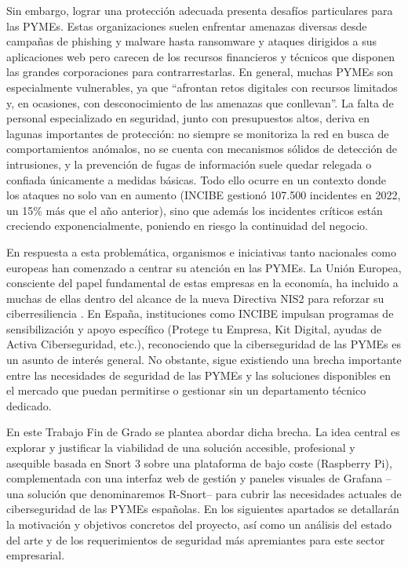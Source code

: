 \documentclass[11pt,a4paper,twoside]{report}
\begin{document}
Sin embargo, lograr una protección adecuada presenta desafíos particulares para las PYMEs. Estas organizaciones suelen enfrentar amenazas diversas desde campañas de phishing y malware hasta ransomware y ataques dirigidos a sus aplicaciones web pero carecen de los recursos financieros y técnicos que disponen las grandes corporaciones para contrarrestarlas. En general, muchas PYMEs son especialmente vulnerables, ya que “afrontan retos digitales con recursos limitados y, en ocasiones, con desconocimiento de las amenazas que conllevan”. La falta de personal especializado en seguridad, junto con presupuestos altos, deriva en lagunas importantes de protección: no siempre se monitoriza la red en busca de comportamientos anómalos, no se cuenta con mecanismos sólidos de detección de intrusiones, y la prevención de fugas de información suele quedar relegada o confiada únicamente a medidas básicas. Todo ello ocurre en un contexto donde los ataques no solo van en aumento (INCIBE gestionó 107.500 incidentes en 2022, un 15\% \cite{telefonica2023} más que el año anterior), sino que además los incidentes críticos están creciendo exponencialmente, poniendo en riesgo la continuidad del negocio.\newline

En respuesta a esta problemática, organismos e iniciativas tanto nacionales como europeas han comenzado a centrar su atención en las PYMEs. La Unión Europea, consciente del papel fundamental de estas empresas en la economía, ha incluido a muchas de ellas dentro del alcance de la nueva Directiva NIS2 para reforzar su ciberresiliencia \cite{incibe2025}. En España, instituciones como INCIBE impulsan programas de sensibilización y apoyo específico (Protege tu Empresa, Kit Digital, ayudas de Activa Ciberseguridad, etc.), reconociendo que la ciberseguridad de las PYMEs es un asunto de interés general. No obstante, sigue existiendo una brecha importante entre las necesidades de seguridad de las PYMEs y las soluciones disponibles en el mercado que puedan permitirse o gestionar sin un departamento técnico dedicado.\newline

En este Trabajo Fin de Grado se plantea abordar dicha brecha. La idea central es explorar y justificar la viabilidad de una solución accesible, profesional y asequible basada en Snort 3 sobre una plataforma de bajo coste (Raspberry Pi), complementada con una interfaz web de gestión y paneles visuales de Grafana –una solución que denominaremos R-Snort– para cubrir las necesidades actuales de ciberseguridad de las PYMEs españolas. En los siguientes apartados se detallarán la motivación y objetivos concretos del proyecto, así como un análisis del estado del arte y de los requerimientos de seguridad más apremiantes para este sector empresarial.
\end{document}
